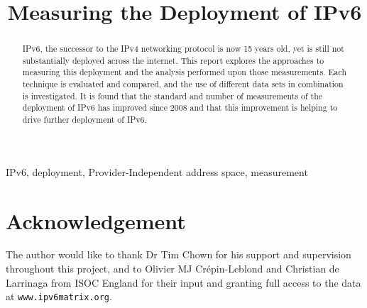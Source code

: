 \documentclass[10pt, final, conference, a4paper]{IEEEtran}
\begin{document}
\title{Measuring the Deployment of IPv6}

\author{
}



\maketitle


\begin{abstract}
IPv6, the successor to the IPv4 networking protocol is now 15 years old, yet is
still not substantially deployed across the internet. This report explores the
approaches to measuring this deployment and the analysis performed upon those
measurements. Each technique is evaluated and compared, and the use of different
data sets in combination is investigated. It is found that the standard and
number of measurements of the deployment of IPv6 has improved since 2008 and
that this improvement is helping to drive further deployment of IPv6. 
\end{abstract}

\begin{IEEEkeywords}
IPv6, deployment, Provider-Independent address space, measurement
\end{IEEEkeywords}







\section{Acknowledgement}

The author would like to thank Dr Tim Chown for his support and supervision
throughout this project, and to Olivier MJ Crépin-Leblond and Christian de
Larrinaga from ISOC England for their input and granting full access to the
data at \verb+www.ipv6matrix.org+.



{}
\end{document}
